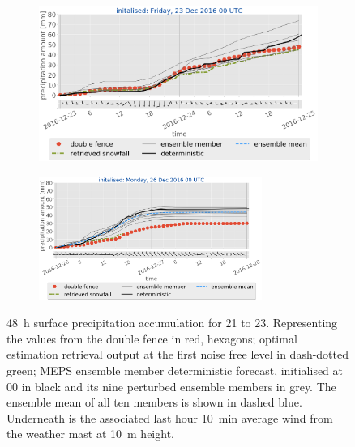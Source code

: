 \begin{figure}[H]
	\begin{subfigure}[t]{0.97\textwidth}	\includegraphics[trim={0.cm 5.2cm 0.cm 0cm},clip,width=\textwidth]{./fig_sfc_acc/acc_wind_20161223_00}
		\caption{}\label{fig:sfc_acc23}
	\end{subfigure}
	\begin{subfigure}[t]{\textwidth}
		\centering
		\includegraphics[trim={1.2cm 0cm 1.1cm 21.4cm},clip,width=0.8\textwidth]{./fig_sfc_acc/acc_wind_20161226_00}
	\end{subfigure}
	\caption{\SI{48}{\hour} surface precipitation accumulation for \num{21} to \SI{23}{\dec}. Representing the values from the double fence in red, hexagons; optimal estimation retrieval output at the first noise free level
		in dash-dotted green; MEPS ensemble member deterministic forecast, initialised at \SI{00}{\UTC} in black and its nine perturbed ensemble members in grey. The ensemble mean of all ten members is shown in dashed blue. Underneath is the associated last hour \SI{10}{\minute} average wind from the weather mast at \SI{10}{\metre} height. }\label{fig:sfc_acc:2123}
\end{figure}
